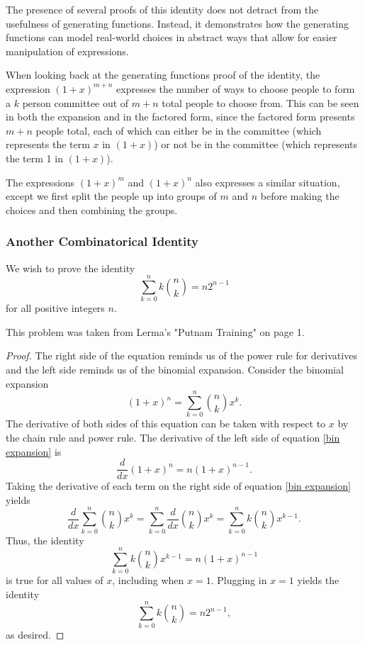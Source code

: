 \documentclass[12pt]{article}
\begin{document}
The presence of several proofs of this identity does not detract from the usefulness of generating functions. Instead, it demonstrates how the generating functions can model real-world choices in abstract ways that allow for easier manipulation of expressions.

When looking back at the generating functions proof of the identity, the expression $(1+x)^{m+n}$ expresses the number of ways to choose people to form a $k$ person committee out of $m+n$ total people to choose from. This can be seen in both the expansion and in the factored form, since the factored form presents $m+n$ people total, each of which can either be in the committee (which represents the term $x$ in $(1+x)$) or not be in the committee (which represents the term 1 in $(1+x)$).

The expressions $(1+x)^m$ and $(1+x)^n$ also expresses a similar situation, except we first split the people up into groups of $m$ and $n$ before making the choices and then combining the groups.
\subsubsection{Another Combinatorical Identity}
We wish to prove the identity \[\sum_{k=0}^n k\binom{n}{k}=n 2^{n-1}\] for all positive integers $n$.

This problem was taken from Lerma's "Putnam Training" on page 1.
\begin{proof}The right side of the equation reminds us of the power rule for derivatives and the left side reminds us of the binomial expansion. Consider the binomial expansion
\begin{equation}\label{bin expansion}(1+x)^n=\sum_{k=0}^{n} \binom{n}{k} x^k.\end{equation} The derivative of both sides of this equation can be taken with respect to $x$ by the chain rule and power rule. The derivative of the left side of equation \ref{bin expansion} is
\[\frac{d}{dx} (1+x)^n = n(1+x)^{n-1}.\] Taking the derivative of each term on the right side of equation \ref{bin expansion} yields
\[\frac{d}{dx} \sum_{k=0}^n \binom{n}{k} x^k = \sum_{k=0}^n \frac{d}{dx}\binom{n}{k} x^k=\sum_{k=0}^n k \binom{n}{k} x^{k-1}.\] Thus, the identity \begin{equation} \label{identity}\sum_{k=0}^n k\binom{n}{k}x^{k-1} = n(1+x)^{n-1}\end{equation} is true for all values of $x$, including when $x=1$. Plugging in $x=1$ yields the identity
\[\sum_{k=0}^n k\binom{n}{k} = n2^{n-1},\] as desired. \end{proof}
\end{document}
